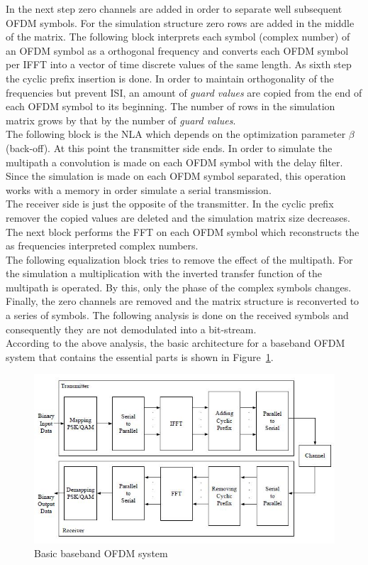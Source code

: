 In the next step zero channels are added in order to separate well subsequent OFDM symbols. For the simulation structure zero rows are added in the middle of the matrix. The following block interprets each symbol (complex number) of an OFDM symbol as a orthogonal frequency and converts each OFDM symbol per IFFT into a vector of time discrete values of the same length. As sixth step the cyclic prefix insertion is done. In order to maintain orthogonality of the frequencies but prevent ISI, an amount of \textit{guard values} are copied from the end of each OFDM symbol to its beginning. The number of rows in the simulation matrix grows by that by the number of \textit{guard values}.\\
The following block is the NLA which depends on the optimization parameter $\beta$ (back-off). At this point the transmitter side ends. In order to simulate the multipath a convolution is made on each OFDM symbol with the delay filter. Since the simulation is made on each OFDM symbol separated, this operation works with a memory in order simulate a serial transmission.\\
The receiver side is just the opposite of the transmitter. In the cyclic prefix remover the copied values are deleted and the simulation matrix size decreases. The next block performs the FFT on each OFDM symbol which reconstructs the as frequencies interpreted complex numbers.\\ The following equalization block tries to remove the effect of the multipath. For the simulation a multiplication with the inverted transfer function of the multipath is operated. By this, only the phase of the complex symbols changes.\\ 
Finally, the zero channels are removed and the matrix structure is reconverted to a series of symbols. The following analysis is done on the received symbols and consequently they are not demodulated into a bit-stream.\\
According to the above analysis, the basic architecture for a baseband OFDM system that contains the essential parts is shown in Figure~\ref{fig:basic_ofdm}.\\

\begin{figure}[h!]
\centering
\includegraphics[width=12cm]{content/fig/basic_ofdm_design.JPG}
\caption{Basic baseband OFDM system}
\label{fig:basic_ofdm}
\end{figure}

